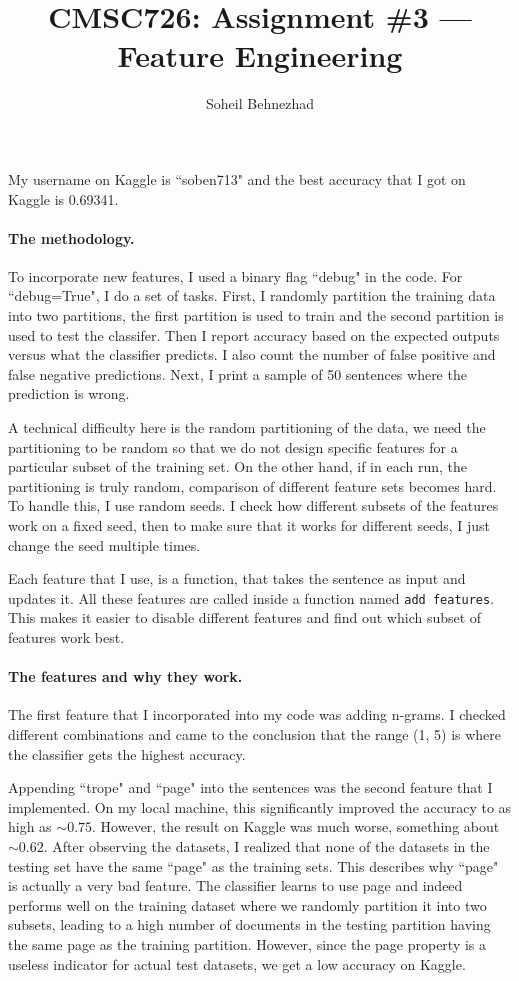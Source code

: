 \documentclass[letterpaper,11pt]{article}
\author{Soheil Behnezhad}
\title{CMSC726: Assignment \#3 --- Feature Engineering}
\begin{document}
\maketitle

\noindent My username on Kaggle is ``soben713" and the best accuracy that I got on Kaggle is 0.69341.

\paragraph{The methodology.} To incorporate new features, I used a binary flag ``debug" in the code. For ``debug=True", I do a set of tasks. First, I randomly partition the training data into two partitions, the first partition is used to train and the second partition is used to test the classifer. Then I report accuracy based on the expected outputs versus what the classifier predicts. I also count the number of false positive and false negative predictions. Next, I print a sample of 50 sentences where the prediction is wrong.

A technical difficulty here is the random partitioning of the data, we need the partitioning to be random so that we do not design specific features for a particular subset of the training set. On the other hand, if in each run, the partitioning is truly random, comparison of different feature sets becomes hard. To handle this, I use random seeds. I check how different subsets of the features work on a fixed seed, then to make sure that it works for different seeds, I just change the seed multiple times.

Each feature that I use, is a function, that takes the sentence as input and updates it. All these features are called inside a function named \texttt{add features}. This makes it easier to disable different features and find out which subset of features work best.

\paragraph{The features and why they work.} The first feature that I incorporated into my code was adding n-grams. I checked different combinations and came to the conclusion that the range (1, 5) is where the classifier gets the highest accuracy.

Appending ``trope" and ``page" into the sentences was the second feature that I implemented. On my local machine, this significantly improved the accuracy to as high as $\sim 0.75$. However, the result on Kaggle was much worse, something about $\sim 0.62$. After observing the datasets, I realized that none of the datasets in the testing set have the same ``page" as the training sets. This describes why ``page" is actually a very bad feature. The classifier learns to use page and indeed performs well on the training dataset where we randomly partition it into two subsets, leading to a high number of documents in the testing partition having the same page as the training partition. However, since the page property is a useless indicator for actual test datasets, we get a low accuracy on Kaggle.
\end{document}
